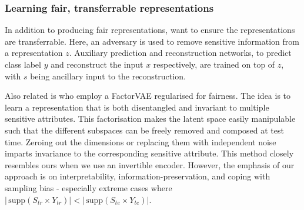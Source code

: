 \subsubsection{Learning fair, transferrable representations}
In addition to producing fair representations, \cite{madras2018learning} want to ensure the representations are transferrable.
Here, an adversary is used to remove sensitive information from a representation $z$.
Auxiliary prediction and reconstruction networks, to predict class label $y$
and reconstruct the input $x$ respectively,
are trained on top of $z$, with $s$ being ancillary input to the reconstruction.

Also related is \cite{creager2019flexibly} who employ a FactorVAE \cite{kim2018disentangling} regularised for fairness.
The idea is to learn a representation that is both disentangled and invariant to multiple sensitive attributes.
This factorisation makes the latent space easily manipulable such that the different subspaces can be freely removed and composed at test time.
Zeroing out the dimensions or replacing them with independent noise imparts invariance to the corresponding sensitive attribute.
This method closely resembles ours when we use an invertible encoder.
However, the emphasis of our approach is on interpretability, information-preservation, and coping with sampling bias - especially extreme cases where $|\, \textrm{supp}(S_{tr} \times Y_{tr}) | < |\, \textrm{supp}(S_{te} \times Y_{te}) |$.


